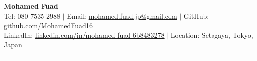 \documentclass[9.5pt, a4paper]{article}
\begin{document}
\begin{center}
  {\fontsize{22}{26}\selectfont\bfseries\color{navyblue} Mohamed Fuad}\\[3pt]
  {\small\color{medgray}
    Tel: 080-7535-2988 \quad $|$ \quad
    Email: \href{mailto:mohamed.fuad.jp@gmail.com}{mohamed.fuad.jp@gmail.com} \quad $|$ \quad
    GitHub: \href{https://github.com/MohamedFuad16}{github.com/MohamedFuad16}
  }\\[2pt]
  {\small\color{medgray}
    LinkedIn: \href{https://linkedin.com/in/mohamed-fuad-6b8483278}{linkedin.com/in/mohamed-fuad-6b8483278} \quad $|$ \quad
    Location: Setagaya, Tokyo, Japan
  }
\end{center}

\vspace{-2pt}
\color{navyblue}\rule{\linewidth}{1.2pt}
\vspace{2pt}
\end{document}
